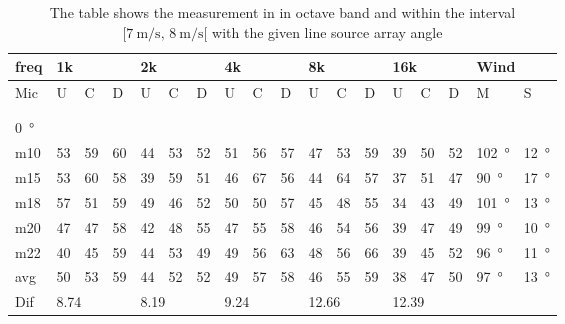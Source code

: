 \begin{table}[H]
\centering
\caption{The table shows the measurement in in octave band and within the interval $[\SI{7}{\meter\per\second},\, \SI{8}{\meter\per\second}[ $ with the given line source array angle}
\setlength\tabcolsep{5pt} %
\begin{tabular}{l|l|l|l|l|l|l|l|l|l|l|l|l|l|l|l|l|l}
freq & \multicolumn{3}{l|}{1k} & \multicolumn{3}{l|}{2k} & \multicolumn{3}{l|}{4k} & \multicolumn{3}{l|}{8k} & \multicolumn{3}{l|}{16k}   &  \multicolumn{2}{l}{Wind}                      \\ \hline
Mic  & U      & C      & D     & U      & C      & D     & U      & C      & D     & U      & C      & D     & U  & C  & D & M &S \\ \hline
 & \multicolumn{3}{l|}{} & \multicolumn{3}{l|}{} & \multicolumn{3}{l|}{} & \multicolumn{3}{l|}{} & \multicolumn{3}{l|}{} &      \multicolumn{2}{l}{}                        \\ 
 \multicolumn{18}{l}{ } \\  
\SI{0}{\degree}   & \multicolumn{3}{l|}{} & \multicolumn{3}{l|}{} & \multicolumn{3}{l|}{} & \multicolumn{3}{l|}{} & \multicolumn{3}{l|}{} &  \multicolumn{2}{l}{}   \\  \hline
m10  & 53     & 59     & 60    & 44     & 53     & 52    & 51     & 56     & 57    & 47     & 53     & 59    & 39 & 50 & 52 & \SI{102}{\degree} & \SI{12}{\degree}  \\
m15  & 53     & 60     & 58    & 39     & 59     & 51    & 46     & 67     & 56    & 44     & 64     & 57    & 37 & 51 & 47 & \SI{90}{\degree} & \SI{17}{\degree}  \\
m18  & 57     & 51     & 59    & 49     & 46     & 52    & 50     & 50     & 57    & 45     & 48     & 55    & 34 & 43 & 49 & \SI{101}{\degree} & \SI{13}{\degree}  \\
m20  & 47     & 47     & 58    & 42     & 48     & 55    & 47     & 55     & 58    & 46     & 54     & 56    & 39 & 47 & 49 & \SI{99}{\degree} & \SI{10}{\degree}  \\
m22  & 40     & 45     & 59    & 44     & 53     & 49    & 49     & 56     & 63    & 48     & 56     & 66    & 39 & 45 & 52 & \SI{96}{\degree} & \SI{11}{\degree}  \\ \hline
avg  &  50     &  53   &  59    &  44    & 52     & 52    &  49    &  57    &  58   &  46    &  55    & 59    & 38   & 47   &  50  & \SI{97}{\degree} & \SI{13}{\degree} \\ \hline  
Dif & \multicolumn{3}{l|}{8.74} & \multicolumn{3}{l|}{8.19} & \multicolumn{3}{l|}{9.24} & \multicolumn{3}{l|}{12.66} &  \multicolumn{3}{l|}{12.39} &  \multicolumn{2}{l}{}  \\ 

\end{tabular}
\end{table}
